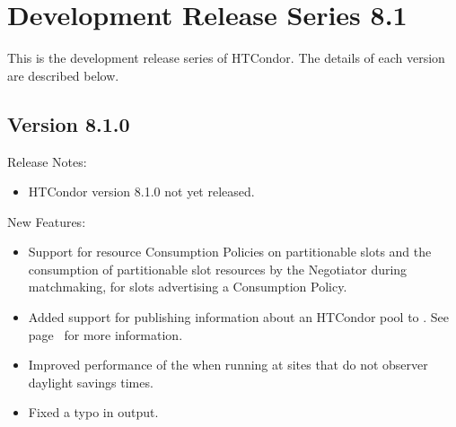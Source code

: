 
\section{\label{sec:History-8-1}Development Release Series 8.1}

This is the development release series of HTCondor.
The details of each version are described below.

\subsection*{\label{sec:New-8-1-0}Version 8.1.0}

\noindent Release Notes:

\begin{itemize}

\item HTCondor version 8.1.0 not yet released.

\end{itemize}


\noindent New Features:

\begin{itemize}

\item Support for resource Consumption Policies on partitionable slots and 
the consumption of partitionable slot resources by the Negotiator 
during matchmaking, for slots advertising a Consumption Policy.

\item Added support for publishing information about an HTCondor pool to .
See page~\pageref{sec:Config-gangliad} for more information.

\item Improved performance of the  when running
at sites that do not observer daylight savings times.

\item Fixed a typo in  output.

\end{itemize}

